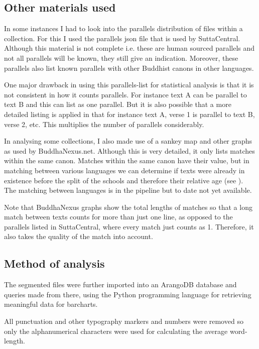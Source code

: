 \subsection{Other materials used}
In some instances I had to look into the parallels distribution of files within a collection. For this I used the parallels json file that is used by SuttaCentral. Although this material is not complete i.e. these are human sourced parallels and not all parallels will be known, they still give an indication. Moreover, these parallels also list known parallels with other Buddhist canons in other languages.

One major drawback in using this parallels-list for statistical analysis is that it is not consistent in how it counts parallels. For instance text A can be parallel to text B and this can list as one parallel. But it is also possible that a more detailed listing is applied in that for instance text A, verse 1 is parallel to text B, verse 2, etc. This multiplies the number of parallels considerably. 

In analysing some collections, I also made use of a sankey map and other graphs as used by BuddhaNexus.net. Although this is very detailed, it only lists matches within the same canon. Matches within the same canon have their value, but in matching between various languages we can determine if texts were already in existence before the split of the schools and therefore their relative age (see \citep{sujatobrahmali}). The matching between languages is in the pipeline but to date not yet available. 

Note that BuddhaNexus graphs show the total lengths of matches so that a long match between texts counts for more than just one line, as opposed to the parallels listed in SuttaCentral, where every match just counts as 1. Therefore, it also takes the quality of the match into account.

\subsection{Method of analysis}
The segmented files were further imported into an ArangoDB database and queries made from there, using the Python programming language for retrieving meaningful data for barcharts.

All punctuation and other typography markers and numbers were removed so only the alphanumerical characters were used for calculating the average word-length.
